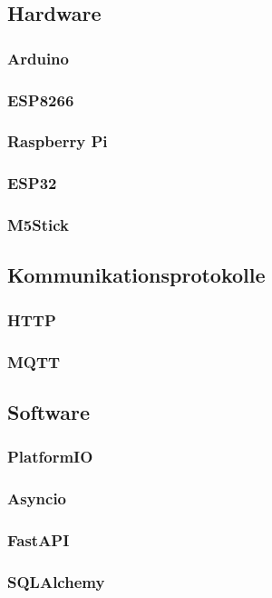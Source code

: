\documentclass[12pt, letterpaper]{article}
\begin{document}
  \subsection{Hardware}
    \subsubsection{Arduino}
    \subsubsection{ESP8266}
    \subsubsection{Raspberry Pi}
    \subsubsection{ESP32}
    \subsubsection{M5Stick}
    

  \subsection{Kommunikationsprotokolle}
  \subsubsection{HTTP}
  \subsubsection{MQTT}
    
  \subsection{Software}
  \subsubsection{PlatformIO}
    \subsubsection{Asyncio}
    \subsubsection{FastAPI}
    \subsubsection{SQLAlchemy}
\end{document}
